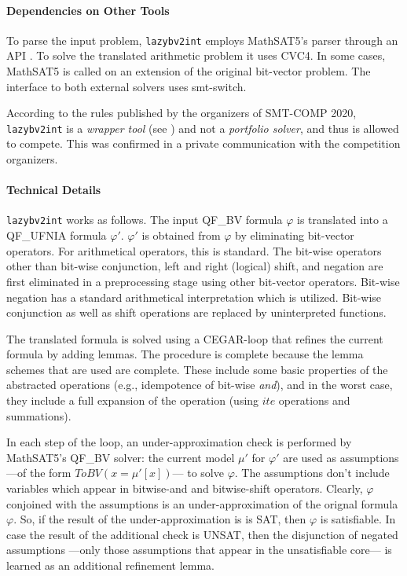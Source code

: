 \documentclass{easychair}
\newcommand{\lazybvtoint}{\texttt{lazybv2int}\xspace}
\newcommand{\smtcomp}{SMT-COMP\xspace}
\newcommand{\qfbv}{QF\_BV\xspace}
\newcommand{\qfufnia}{QF\_UFNIA\xspace}
\newcommand{\msat}{MathSAT5\xspace}
\newcommand{\cvcfour}{CVC4\xspace}
\newcommand{\smtswitch}{smt-switch\xspace}
\begin{document}
\paragraph{Dependencies on Other Tools}
%
To parse the input problem, \lazybvtoint employs \msat's
parser through an API \cite{mathsat5}.
To solve the translated arithmetic problem it uses \cvcfour \cite{cvc4}.
In some cases, \msat is called on an extension of the original bit-vector problem.
%
The interface to both external solvers uses
\smtswitch \cite{smtswitchgithub}.

According to the rules published by the organizers
of \smtcomp 2020, \lazybvtoint is a {\em wrapper tool} (see \cite{rules20})
and not a {\em portfolio solver},
and thus is allowed to compete.
This was confirmed in a private communication with the competition organizers.

\paragraph{Technical Details}
\lazybvtoint works as follows. The input \qfbv formula $\varphi$ is translated
into a \qfufnia formula $\varphi'$. $\varphi'$ is obtained from $\varphi$ by
eliminating bit-vector operators. For arithmetical operators, this is standard.
The bit-wise operators other than bit-wise conjunction, left and right (logical)
shift, and negation are first eliminated in a preprocessing stage using other
bit-vector operators. Bit-wise negation has a standard arithmetical
interpretation which is utilized. Bit-wise conjunction as well as shift
operations are replaced by uninterpreted functions.

The translated formula is solved using a CEGAR-loop that refines the current
formula by adding lemmas. The procedure is complete because the lemma schemes
that are used are complete.
%
These include some basic properties of the abstracted operations (e.g.,
idempotence of bit-wise \emph{and}), and in the worst case, they include a full
expansion of the operation (using $ite$ operations and summations).

In each step of the loop, an under-approximation check is performed by \msat's
\qfbv solver: the current model $\mu'$ for $\varphi'$ are used as assumptions
---of the form $ToBV(x = \mu'[x])$--- to solve $\varphi$. The assumptions don't
include variables which appear in bitwise-and and bitwise-shift operators.
Clearly, $\varphi$ conjoined with the assumptions is an under-approximation of
the orignal formula $\varphi$. So, if the result of the under-approximation is
is SAT, then $\varphi$ is satisfiable. In case the result of the additional
check is UNSAT, then the disjunction of negated assumptions ---only those
assumptions that appear in the unsatisfiable core--- is learned as an additional
refinement lemma.
\end{document}
